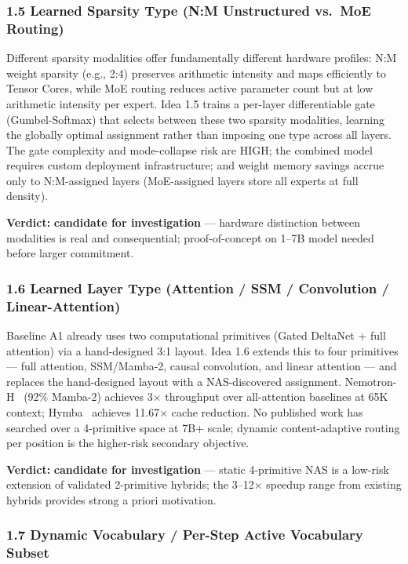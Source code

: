 \documentclass[11pt]{article}
\begin{document}
\subsubsection{1.5 Learned Sparsity Type (N:M Unstructured vs.\ MoE Routing)}
\label{sec:idea_1_5}

Different sparsity modalities offer fundamentally different hardware profiles: N:M weight sparsity (e.g., 2:4) preserves arithmetic intensity and maps efficiently to Tensor Cores, while MoE routing reduces active parameter count but at low arithmetic intensity per expert.
Idea 1.5 trains a per-layer differentiable gate (Gumbel-Softmax) that selects between these two sparsity modalities, learning the globally optimal assignment rather than imposing one type across all layers.
The gate complexity and mode-collapse risk are HIGH; the combined model requires custom deployment infrastructure; and weight memory savings accrue only to N:M-assigned layers (MoE-assigned layers store all experts at full density).

\textbf{Verdict:} \textbf{candidate for investigation} --- hardware distinction between modalities is real and consequential; proof-of-concept on 1--7B model needed before larger commitment.

\subsubsection{1.6 Learned Layer Type (Attention / SSM / Convolution / Linear-Attention)}
\label{sec:idea_1_6}

Baseline A1 already uses two computational primitives (Gated DeltaNet + full attention) via a hand-designed 3:1 layout.
Idea 1.6 extends this to four primitives --- full attention, SSM/Mamba-2, causal convolution, and linear attention --- and replaces the hand-designed layout with a NAS-discovered assignment.
Nemotron-H~\cite{NVIDIAADLR2025} (92\% Mamba-2) achieves 3$\times$ throughput over all-attention baselines at 65K context; Hymba~\cite{Dong2024Hymba} achieves 11.67$\times$ cache reduction.
No published work has searched over a 4-primitive space at 7B+ scale; dynamic content-adaptive routing per position is the higher-risk secondary objective.

\textbf{Verdict:} \textbf{candidate for investigation} --- static 4-primitive NAS is a low-risk extension of validated 2-primitive hybrids; the 3--12$\times$ speedup range from existing hybrids provides strong a priori motivation.

\subsubsection{1.7 Dynamic Vocabulary / Per-Step Active Vocabulary Subset}
\label{sec:idea_1_7}
\end{document}
